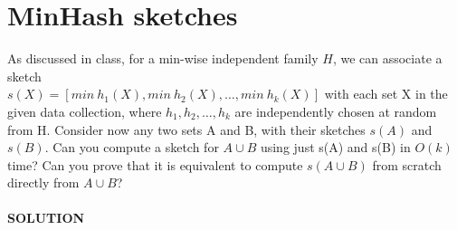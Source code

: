 \documentclass[a4paper]{article}
\begin{document}
\section*{MinHash sketches}
As discussed in class, for a min-wise independent family $H$, we
can associate a sketch \\
$s(X) = [min \ h_1(X), min \ h_2(X),\dots , min \ h_k(X)]$ with each set X
in the given data collection, where $h_1, h_2,\dots, h_k$ are independently chosen at random
from H. Consider now any two sets A and B, with their sketches $s(A)$ and $s(B)$. Can
you compute a sketch for $A \cup B$ using just s(A) and s(B) in $O(k)$ time? Can you prove
that it is equivalent to compute $s(A \cup B)$ from scratch directly from $A \cup B$?
\\
\\
\textbf{SOLUTION}
\\
\\
\end{document}
